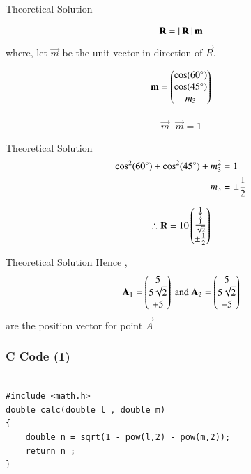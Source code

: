 \documentclass{beamer}
\begin{document}
\begin{frame}{Theoretical Solution}

\begin{align}
    \mathbf{R} = \left\lVert\mathbf{R}\right\rVert \mathbf{m}
\end{align}
where, let $\vec{m}$ be the unit vector in direction of $\vec{R}$. 


\begin{align}
    \mathbf{m} = \begin{pmatrix}\cos(60\degree) \\ \cos(45\degree) \\ m_3 \end{pmatrix}
\end{align}

\begin{align}
    \vec{m}^{\top}\vec{m} = 1
\end{align}
\end{frame}
\begin{frame}{Theoretical Solution}
  \begin{align}
    \cos^2(60\degree) + \cos^2(45\degree) + m_3^2 &= 1 \\ 
    m_3 &=\pm \frac{1}{2}  
\end{align}

\begin{align}
    \therefore \mathbf{R} = 10\begin{pmatrix}\frac{1}{2} \\ \frac{1}{\sqrt{2}} \\ \pm \frac{1}{2}\end{pmatrix}
\end{align}
\end{frame}
\begin{frame}{Theoretical Solution}
Hence , 
\begin{align}
    \mathbf{A}_1 = \begin{pmatrix}5 \\ 5\sqrt{2} \\ +5\end{pmatrix} \text{ and } \mathbf{A}_2 = \begin{pmatrix}5 \\ 5\sqrt{2} \\ -5\end{pmatrix} 
\end{align}
are the position vector for point $\vec{A}$
  
\end{frame}
\begin{frame}[fragile]
    \frametitle{C Code (1) }

    \begin{lstlisting}

#include <math.h>
double calc(double l , double m)
{
    double n = sqrt(1 - pow(l,2) - pow(m,2));
    return n ;
}

    \end{lstlisting}
\end{frame}
\end{document}
